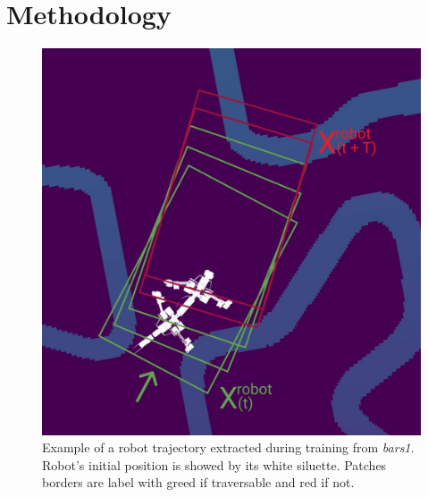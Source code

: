 \documentclass[../document.tex]{subfiles}
\begin{document}
\chapter{Methodology}
\begin{figure}[H]
    \centering
        \includegraphics[width=\textwidth]{../img/krock-bars-correct.jpg}
    \caption{Example of a robot trajectory extracted during training from \emph{bars1}. Robot's initial position is showed by its white siluette. Patches borders are label with greed if traversable and red if not.}
    \end{figure}
\end{document}
